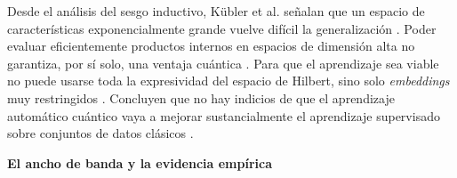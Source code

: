Desde el análisis del sesgo inductivo, Kübler et al. señalan que un espacio de características exponencialmente grande vuelve difícil la generalización \cite{Kubler2021Inductive}.
Poder evaluar eficientemente productos internos en espacios de dimensión alta no garantiza, por sí solo, una ventaja cuántica \cite{Kubler2021Inductive}.
Para que el aprendizaje sea viable no puede usarse toda la expresividad del espacio de Hilbert, sino solo \textit{embeddings} muy restringidos \cite{Kubler2021Inductive}.
Concluyen que no hay indicios de que el aprendizaje automático cuántico vaya a mejorar sustancialmente el aprendizaje supervisado sobre conjuntos de datos clásicos \cite{Kubler2021Inductive}.

\textbf{El ancho de banda y la evidencia empírica}

